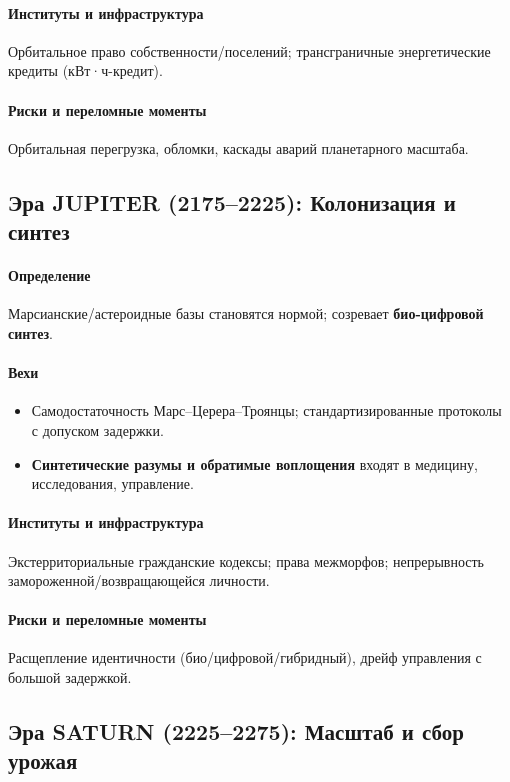 \documentclass[11pt]{article}
\begin{document}
\paragraph{Институты и инфраструктура} Орбитальное право собственности/поселений; трансграничные энергетические кредиты (кВт·ч-кредит).

\paragraph{Риски и переломные моменты} Орбитальная перегрузка, обломки, каскады аварий планетарного масштаба.

\subsection{Эра JUPITER (2175–2225): Колонизация и синтез}
\paragraph{Определение} Марсианские/астероидные базы становятся нормой; созревает \textbf{био-цифровой синтез}.

\paragraph{Вехи}
\begin{itemize}[noitemsep]
  \item Самодостаточность Марс–Церера–Троянцы; стандартизированные протоколы с допуском задержки.
  \item \textbf{Синтетические разумы и обратимые воплощения} входят в медицину, исследования, управление.
\end{itemize}

\paragraph{Институты и инфраструктура} Экстерриториальные гражданские кодексы; права межморфов; непрерывность замороженной/возвращающейся личности.

\paragraph{Риски и переломные моменты} Расщепление идентичности (био/цифровой/гибридный), дрейф управления с большой задержкой.

\subsection{Эра SATURN (2225–2275): Масштаб и сбор урожая}
\end{document}
